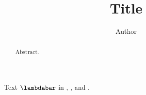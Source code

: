 \documentclass{aastex631}
\begin{document}
\title{Title}
\author{Author}
\begin{abstract}Abstract.\end{abstract}
Text $\lambdabar$ in \maps, \jaavso, \aas{} and \dps.
\tablefontsize{\small}
\listofchanges
\end{document}
